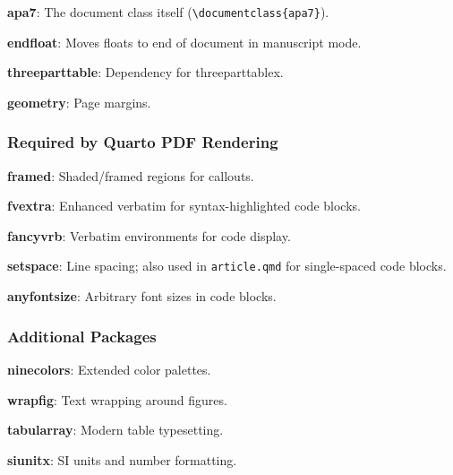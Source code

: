 \documentclass[
  man,
  longtable,
  nolmodern,
  notxfonts,
  notimes,
  colorlinks=true,linkcolor=blue,citecolor=blue,urlcolor=blue]{apa7}
\begin{document}
\textbf{apa7}: The document class itself
(\texttt{\textbackslash{}documentclass\{apa7\}}).

\textbf{endfloat}: Moves floats to end of document in manuscript mode.

\textbf{threeparttable}: Dependency for threeparttablex.

\textbf{geometry}: Page margins.

\subsubsection{Required by Quarto PDF
Rendering}\label{required-by-quarto-pdf-rendering}

\textbf{framed}: Shaded/framed regions for callouts.

\textbf{fvextra}: Enhanced verbatim for syntax-highlighted code blocks.

\textbf{fancyvrb}: Verbatim environments for code display.

\textbf{setspace}: Line spacing; also used in \texttt{article.qmd} for
single-spaced code blocks.

\textbf{anyfontsize}: Arbitrary font sizes in code blocks.

\subsubsection{Additional Packages}\label{additional-packages}

\textbf{ninecolors}: Extended color palettes.

\textbf{wrapfig}: Text wrapping around figures.

\textbf{tabularray}: Modern table typesetting.

\textbf{siunitx}: SI units and number formatting.
\end{document}
